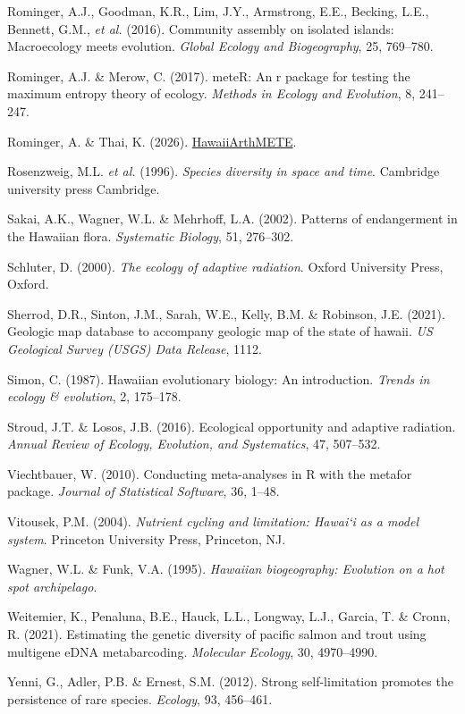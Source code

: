 \documentclass[
  letterpaper,
  DIV=11,
  numbers=noendperiod]{scrartcl}
\newlength{\cslhangindent}
\newenvironment{CSLReferences}[2] %
 {\begin{list}{}{%
  \setlength{\itemindent}{0pt}
  \setlength{\leftmargin}{0pt}
  \setlength{\parsep}{0pt}
  \ifodd #1
   \setlength{\leftmargin}{\cslhangindent}
   \setlength{\itemindent}{-1\cslhangindent}
  \fi
  \setlength{\itemsep}{#2\baselineskip}}}
 {\end{list}}
\begin{document}
\begin{CSLReferences}{1}{0}
Rominger, A.J., Goodman, K.R., Lim, J.Y., Armstrong, E.E., Becking,
L.E., Bennett, G.M., \emph{et al.} (2016). Community assembly on
isolated islands: Macroecology meets evolution. \emph{Global Ecology and
Biogeography}, 25, 769--780.

Rominger, A.J. \& Merow, C. (2017). meteR: An r package for testing the
maximum entropy theory of ecology. \emph{Methods in Ecology and
Evolution}, 8, 241--247.

Rominger, A. \& Thai, K. (2026).
\href{https://github.com/ecoevomatics/HawaiiArthMETE}{{HawaiiArthMETE}}.

Rosenzweig, M.L. \emph{et al.} (1996). \emph{Species diversity in space
and time}. Cambridge university press Cambridge.

Sakai, A.K., Wagner, W.L. \& Mehrhoff, L.A. (2002). Patterns of
endangerment in the {Hawaiian} flora. \emph{Systematic Biology}, 51,
276--302.

Schluter, D. (2000). \emph{The ecology of adaptive radiation}. Oxford
University Press, Oxford.

Sherrod, D.R., Sinton, J.M., Sarah, W.E., Kelly, B.M. \& Robinson, J.E.
(2021). Geologic map database to accompany geologic map of the state of
hawaii. \emph{US Geological Survey (USGS) Data Release}, 1112.

Simon, C. (1987). Hawaiian evolutionary biology: An introduction.
\emph{Trends in ecology \& evolution}, 2, 175--178.

Stroud, J.T. \& Losos, J.B. (2016). Ecological opportunity and adaptive
radiation. \emph{Annual Review of Ecology, Evolution, and Systematics},
47, 507--532.

Viechtbauer, W. (2010). Conducting meta-analyses in {R} with the
{metafor} package. \emph{Journal of Statistical Software}, 36, 1--48.

Vitousek, P.M. (2004). \emph{Nutrient cycling and limitation: {Hawai`i}
as a model system}. Princeton University Press, Princeton, NJ.

Wagner, W.L. \& Funk, V.A. (1995). \emph{Hawaiian biogeography:
Evolution on a hot spot archipelago}.

Weitemier, K., Penaluna, B.E., Hauck, L.L., Longway, L.J., Garcia, T. \&
Cronn, R. (2021). Estimating the genetic diversity of pacific salmon and
trout using multigene eDNA metabarcoding. \emph{Molecular Ecology}, 30,
4970--4990.

Yenni, G., Adler, P.B. \& Ernest, S.M. (2012). Strong self-limitation
promotes the persistence of rare species. \emph{Ecology}, 93, 456--461.

\end{CSLReferences}
\end{document}
